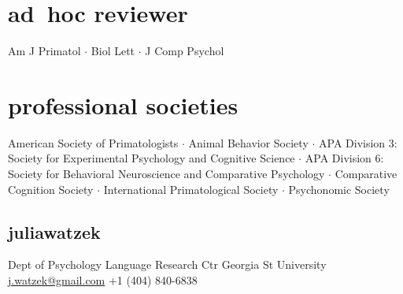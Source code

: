 \documentclass[]{friggeri-cv}
\begin{document}

\section{ad~hoc reviewer}
    Am J Primatol $\cdot$ Biol Lett $\cdot$ J Comp Psychol \\[.5cm]



\section{professional societies}
    American Society of Primatologists $\cdot$ %
    Animal Behavior Society $\cdot$ %
    APA Division 3: Society for Experimental Psychology and Cognitive Science $\cdot$ %
    APA Division 6: Society for Behavioral Neuroscience and Comparative Psychology $\cdot$ %
    Comparative Cognition Society $\cdot$ %
    International Primatological Society $\cdot$ %
    Psychonomic Society \\[.5cm]%




\begin{aside}
  \section{{\normalfont julia}watzek}
    Dept of Psychology
    Language Research Ctr
    Georgia St University
    ~
    \href{mailto:j.watzek@gmail.com}{j.watzek@gmail.com}
    +1 (404) 840-6838
\end{aside}


\end{document}
